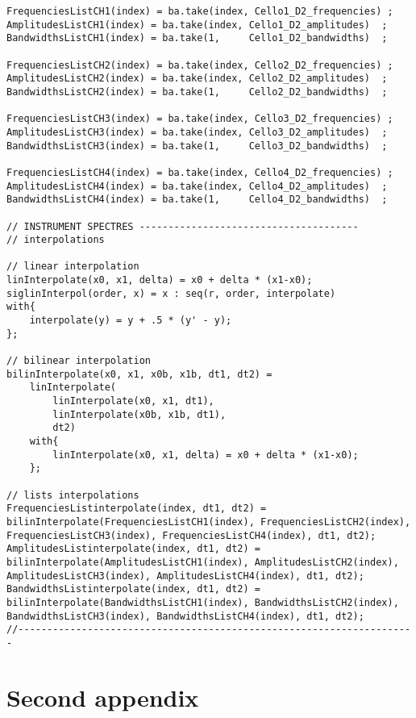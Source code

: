 \begin{lstlisting}
FrequenciesListCH1(index) = ba.take(index, Cello1_D2_frequencies) ;
AmplitudesListCH1(index) = ba.take(index, Cello1_D2_amplitudes)  ;
BandwidthsListCH1(index) = ba.take(1,     Cello1_D2_bandwidths)  ;

FrequenciesListCH2(index) = ba.take(index, Cello2_D2_frequencies) ;
AmplitudesListCH2(index) = ba.take(index, Cello2_D2_amplitudes)  ;
BandwidthsListCH2(index) = ba.take(1,     Cello2_D2_bandwidths)  ;

FrequenciesListCH3(index) = ba.take(index, Cello3_D2_frequencies) ;
AmplitudesListCH3(index) = ba.take(index, Cello3_D2_amplitudes)  ;
BandwidthsListCH3(index) = ba.take(1,     Cello3_D2_bandwidths)  ;

FrequenciesListCH4(index) = ba.take(index, Cello4_D2_frequencies) ;
AmplitudesListCH4(index) = ba.take(index, Cello4_D2_amplitudes)  ;
BandwidthsListCH4(index) = ba.take(1,     Cello4_D2_bandwidths)  ;

// INSTRUMENT SPECTRES --------------------------------------
// interpolations

// linear interpolation
linInterpolate(x0, x1, delta) = x0 + delta * (x1-x0);
siglinInterpol(order, x) = x : seq(r, order, interpolate)
with{
    interpolate(y) = y + .5 * (y' - y);
};

// bilinear interpolation
bilinInterpolate(x0, x1, x0b, x1b, dt1, dt2) = 
    linInterpolate(
        linInterpolate(x0, x1, dt1), 
        linInterpolate(x0b, x1b, dt1),
        dt2)
    with{
        linInterpolate(x0, x1, delta) = x0 + delta * (x1-x0);
    };

// lists interpolations
FrequenciesListinterpolate(index, dt1, dt2) = bilinInterpolate(FrequenciesListCH1(index), FrequenciesListCH2(index), FrequenciesListCH3(index), FrequenciesListCH4(index), dt1, dt2);
AmplitudesListinterpolate(index, dt1, dt2) = bilinInterpolate(AmplitudesListCH1(index), AmplitudesListCH2(index), AmplitudesListCH3(index), AmplitudesListCH4(index), dt1, dt2);
BandwidthsListinterpolate(index, dt1, dt2) = bilinInterpolate(BandwidthsListCH1(index), BandwidthsListCH2(index), BandwidthsListCH3(index), BandwidthsListCH4(index), dt1, dt2);
//---------------------------------------------------------------------
\end{lstlisting}

\clearpage
\section{Second appendix}